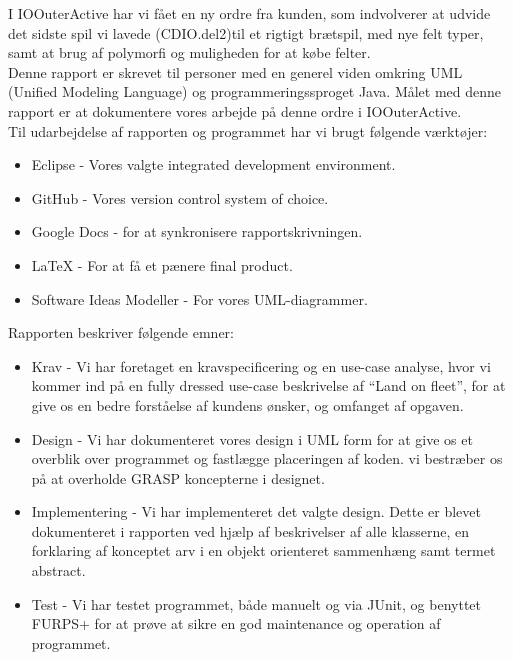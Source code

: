I IOOuterActive har vi fået en ny ordre fra kunden, som indvolverer at udvide
det sidste spil vi lavede (CDIO.del2)til et rigtigt brætspil, med nye felt typer,
samt at brug af polymorfi og muligheden for at købe felter.\\
\indent Denne rapport er skrevet til personer med en generel viden omkring UML
(Unified Modeling Language) og programmeringssproget Java. Målet med denne
rapport er at dokumentere vores arbejde på denne ordre i IOOuterActive.\\
\indent Til udarbejdelse af rapporten og programmet har vi brugt følgende
værktøjer:
\begin{itemize}
  \item Eclipse - Vores valgte integrated development environment.
  \item GitHub - Vores version control system of choice.
  \item Google Docs - for at synkronisere rapportskrivningen.
  \item LaTeX - For at få et pænere final product.
  \item Software Ideas Modeller - For vores UML-diagrammer.
\end{itemize}
Rapporten beskriver følgende emner:
\begin{itemize}
  \item Krav - Vi har foretaget en kravspecificering og en use-case analyse,
  hvor vi kommer ind på en fully dressed use-case beskrivelse  af  “Land on fleet”,
  for at give os en bedre forståelse af kundens ønsker, og omfanget af
  opgaven.
  \item Design - Vi har dokumenteret vores design i UML form for at give os et
  overblik over programmet og fastlægge placeringen af koden. vi bestræber os på
  at overholde GRASP koncepterne i designet.
  \item Implementering - Vi har implementeret det valgte design. Dette er blevet
  dokumenteret i rapporten ved hjælp af beskrivelser af alle klasserne, en
  forklaring af konceptet arv i en objekt orienteret sammenhæng samt termet
  abstract.
  \item Test - Vi har testet programmet, både manuelt og via JUnit, og benyttet
  FURPS+ for at prøve at sikre en god maintenance og operation af programmet.
\end{itemize}
